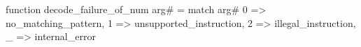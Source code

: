 function decode_failure_of_num arg# = match arg# {
  0 => no_matching_pattern,
  1 => unsupported_instruction,
  2 => illegal_instruction,
  _ => internal_error
}
